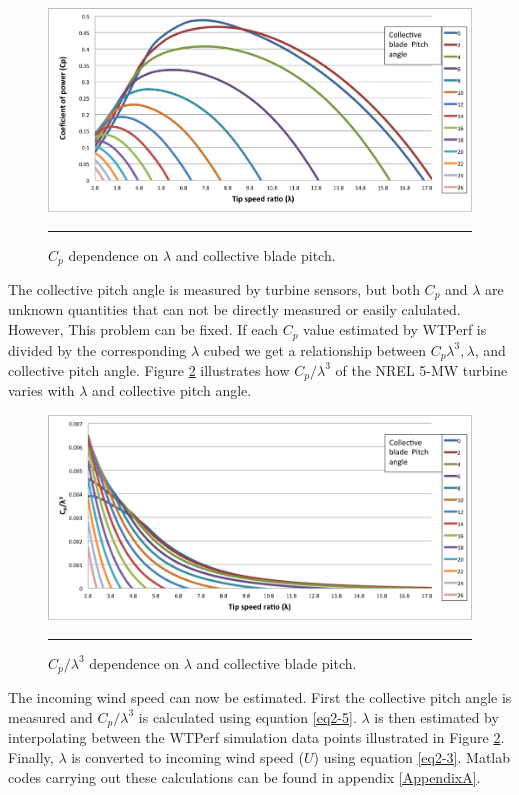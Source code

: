 \begin{figure}[htbp]
	\centering
		\includegraphics[width=\textwidth]{Figures/ch2Figures/fig2-13.png}
		\rule{35em}{0.5pt}
	\caption{$C_p$ dependence on $\lambda$ and collective blade pitch.}
	\label{fig2-13}
\end{figure}

The collective pitch angle is measured by turbine sensors, but both $C_p$ and $\lambda$ are unknown quantities that can not be directly measured or easily calulated. However, This problem can be fixed. If each $C_p$ value estimated by WTPerf is divided by the corresponding $\lambda$ cubed we get a relationship between $C_p\lambda^3, \lambda$, and collective pitch angle. Figure \ref{fig2-14}  illustrates how $C_p / \lambda^3$ of the NREL 5-MW turbine varies with $\lambda$ and collective pitch angle. 

\begin{figure}[htbp]
	\centering
		\includegraphics[width=\textwidth]{Figures/ch2Figures/fig2-14.png}
		\rule{35em}{0.5pt}
	\caption{$C_p / \lambda^3$ dependence on $\lambda$ and collective blade pitch.}
	\label{fig2-14}
\end{figure}

The incoming wind speed can now be estimated. First the collective pitch angle is measured and $C_p / \lambda^3$ is calculated using equation \ref{eq2-5}. $\lambda$ is then estimated by interpolating between the WTPerf simulation data points illustrated in Figure \ref{fig2-14}. Finally, $\lambda$ is converted to incoming wind speed ($U$) using equation \ref{eq2-3}. Matlab codes carrying out these calculations can be found in appendix \ref{AppendixA}.



